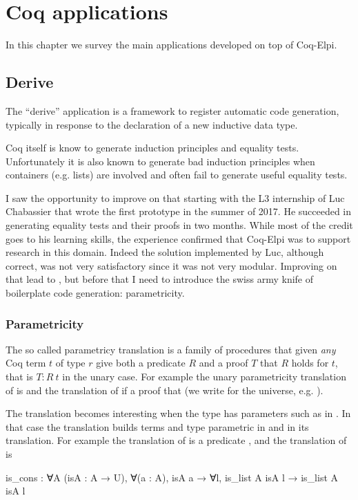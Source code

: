 \documentclass[a4paper, 11pt]{book}
\begin{document}
\chapter{Coq applications}

In this chapter we survey the main applications developed on top of Coq-Elpi.

\section{Derive}

The ``derive'' application is a framework to register automatic
code generation, typically in response to the declaration of a new inductive
data type.

Coq itself is know to generate induction principles and equality tests.
Unfortunately it is also known to generate bad induction principles when
containers (e.g. lists) are involved and often fail to generate useful
equality tests.

I saw the opportunity to improve on that starting with the L3 internship of
Luc Chabassier that wrote the first prototype in the summer of 2017.
He succeeded in generating
equality tests and their proofs in two months. While most of the credit goes to
his learning skills, the experience confirmed that Coq-Elpi was to support
research in this domain. Indeed the solution implemented by Luc, although
correct, was not very satisfactory since it was not very modular. Improving
on that lead to \cite{tassi:hal-01897468}, but before that I need to introduce
the swiss army knife of boilerplate code generation: parametricity.

\subsection{Parametricity}

The so called parametricy translation \cite{keller_et_al:LIPIcs.CSL.2012.381}
is a family of procedures that given \emph{any} Coq term $t$ of type $r$
give both a predicate $R$ and a proof $T$ that $R$ holds for $t$, that is $T : R~t$
in the unary case. For example the unary parametricity translation of
 is  and
the translation of  if a proof that  (we write
 for the universe, e.g. ).

The translation becomes interesting when the type has parameters such as
 in . In that case the translation builds
terms and type parametric in  and in its translation. For example
the translation of  is a predicate
,
and the translation of  is
\begin{coqcode}
is_cons : ∀A (isA : A → U),
  ∀(a : A), isA a →
  ∀l, is_list A isA l →
    is_list A isA l
\end{coqcode}
\end{document}

